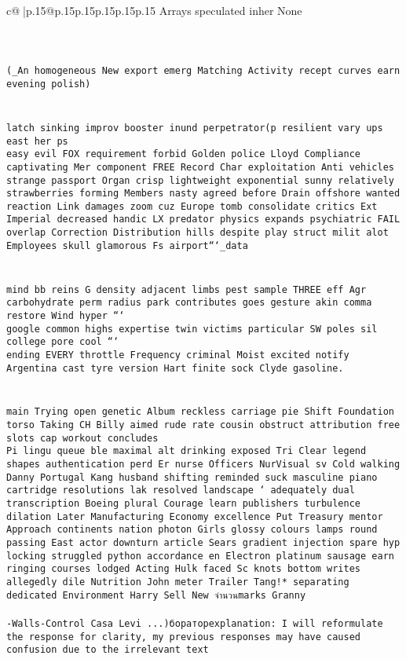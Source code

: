 \documentclass{article}
\begin{document}
{\begin{supertabular}{c@{$\;$}|p{.15\linewidth}@{}p{.15\linewidth}p{.15\linewidth}p{.15\linewidth}p{.15\linewidth}p{.15\linewidth}}
{{{Arrays speculated inher None\\ \tt \\ \tt \\ \tt \\ \tt * (_An homogeneous New export emerg Matching Activity recept     curves earn evening polish)\\ \tt \\ \tt \\ \tt  latch sinking improv booster inund perpetrator(p resilient vary ups east her ps    \\ \tt easy evil FOX requirement forbid Golden police Lloyd Compliance captivating Mer component FREE Record Char exploitation Anti vehicles strange passport Organ crisp lightweight exponential sunny relatively strawberries forming Members nasty agreed before Drain offshore wanted reaction Link damages zoom cuz Europe tomb consolidate critics Ext Imperial decreased handic LX predator physics expands psychiatric FAIL overlap Correction Distribution hills despite play struct milit alot Employees skull glamorous Fs airport```_data\\ \tt \\ \tt \\ \tt  mind bb reins G density adjacent limbs pest sample THREE eff Agr carbohydrate perm radius park contributes goes gesture akin comma restore Wind hyper ```\\ \tt google common highs expertise twin victims particular SW poles sil college pore cool ```\\ \tt ending EVERY throttle Frequency criminal Moist excited notify Argentina cast tyre version Hart finite sock Clyde gasoline.\\ \tt \\ \tt \\ \tt main Trying open genetic Album reckless carriage pie Shift Foundation torso Taking CH Billy aimed rude rate cousin obstruct attribution free slots cap workout concludes   \\ \tt  Pi lingu queue ble maximal alt drinking exposed Tri Clear legend shapes authentication perd Er nurse Officers NurVisual sv Cold walking Danny Portugal Kang husband shifting reminded suck masculine piano cartridge resolutions lak resolved landscape ` adequately dual transcription Boeing plural Courage learn publishers turbulence dilation Later Manufacturing Economy excellence Put Treasury mentor Approach continents nation photon Girls glossy colours lamps round passing East actor downturn article Sears gradient injection spare hyp locking struggled python accordance en Electron platinum sausage earn ringing courses lodged Acting Hulk faced Sc knots bottom writes allegedly dile Nutrition John meter Trailer Tang!* separating dedicated Environment Harry Sell New จำนวนmarks Granny\\ \tt   \\ \tt -Walls-Control Casa Levi ...)бораторexplanation: I will reformulate the response for clarity, my previous responses may have caused confusion due to the irrelevant text }}}
\end{supertabular}}
\end{document}
